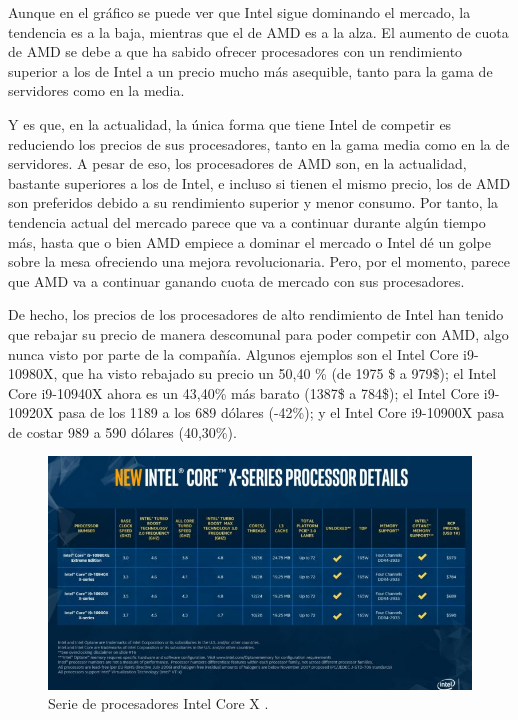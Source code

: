 \documentclass[11pt,a4paper]{article}
\begin{document}
Aunque en el gráfico se puede ver que Intel sigue dominando el mercado, la tendencia es a la baja,
mientras que el de AMD es a la alza. El aumento de cuota de AMD se debe a que ha sabido ofrecer
procesadores con un rendimiento superior a los de Intel a un precio mucho más asequible, tanto
para la gama de servidores como en la media.

Y es que, en la actualidad, la única forma que tiene Intel de competir es reduciendo los precios
de sus procesadores, tanto en la gama media como en la de servidores. A pesar de eso, los
procesadores de AMD son, en la actualidad, bastante superiores a los de Intel, e incluso si tienen
el mismo precio, los de AMD son preferidos debido a su rendimiento superior y menor consumo. Por
tanto, la tendencia actual del mercado parece que va a continuar durante algún tiempo más, hasta
que o bien AMD empiece a dominar el mercado o Intel dé un golpe sobre la mesa ofreciendo una
mejora revolucionaria. Pero, por el momento, parece que AMD va a continuar ganando cuota de
mercado con sus procesadores.

De hecho, los precios de los procesadores de alto rendimiento de Intel han tenido que rebajar su
precio de manera descomunal para poder competir con AMD, algo nunca visto por parte de la
compañía. Algunos ejemplos son el Intel Core i9-10980X, que ha visto rebajado su precio un 50,40
\% (de 1975 \$ a 979\$); el Intel Core i9-10940X ahora es un 43,40\% más barato (1387\$ a 784\$);
el Intel Core i9-10920X pasa de los 1189 a los 689 dólares (-42\%); y el Intel Core i9-10900X pasa
de costar 989 a 590 dólares (40,30\%).

\begin{figure}[H]
  \centering
  \includegraphics[scale=0.5]{img/procesadores-intel}
  \caption{Serie de procesadores Intel Core X \cite{chapuzas4}.}
\end{figure}
\end{document}

